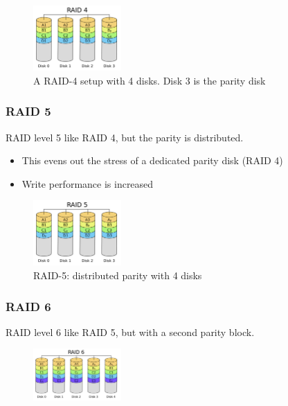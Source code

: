 \documentclass{article}
\begin{document}
\begin{figure}[H]
    \centering
    \includegraphics[width=0.3\textwidth]{raid-4.png}
    \caption{A RAID-4 setup with 4 disks. Disk 3 is the parity disk}
\end{figure}


\subsubsection{RAID 5}

RAID level 5 like RAID 4, but the parity is distributed.

\begin{itemize}
    \item This evens out the stress of a dedicated parity disk (RAID 4)
    \item Write performance is increased
\end{itemize}

\begin{figure}[H]
    \centering
    \includegraphics[width=0.3\textwidth]{raid-5.png}
    \caption{RAID-5: distributed parity with 4 disks}
\end{figure}


\subsubsection{RAID 6}

RAID level 6 like RAID 5, but with a second parity block.

\begin{figure}[H]
    \centering
    \includegraphics[width=0.3\textwidth]{raid-6.png}
    \caption{}
\end{figure}
\end{document}
